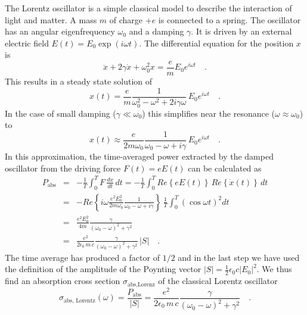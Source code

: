 The Lorentz oscillator is a simple classical model to describe the interaction of light and matter. A mass $m$ of charge $+e$ is connected to a spring. The oscillator has an angular eigenfrequency $\omega_0$ and a damping $\gamma$. It is driven by an external electric field $E(t) = E_0 \exp(i \omega t)$. The differential equation for the position $x$ is
\begin{equation}
  \ddot{x} + 2 \gamma \dot{x} + \omega_0^2 x = \frac{e}{m} E_0 e^{i \omega t} \quad . \label{eq:1_dgl_osci}
\end{equation}
This results in a steady state solution of
\begin{equation}
  x(t) = \frac{e}{m}  \frac{1}{\omega_0^2 - \omega^2 + 2 i \gamma \omega} \, E_0 e^{i \omega t}  \quad .
\end{equation}
In the case of small damping ($\gamma \ll \omega_0$) this simplifies near the resonance ($\omega \approx \omega_0$) to
\begin{equation}
  x(t) \approx \frac{e}{2 m \omega_0}  \frac{1}{\omega_0 - \omega + i \gamma} \, E_0 e^{i \omega t}  \quad .
\end{equation}
In this approximation, the time-averaged power extracted by the damped oscillator from the driving force $F(t) = e E(t)$ can be calculated as
%
\begin{eqnarray}
 P_{\text{abs}} &= &  - \frac{1}{T} \int_0^T F \, \frac{d x}{dt} \, dt =  
  - \frac{1}{T}  \int_0^T Re \left\{  e E(t) \right\}  \, Re \left\{ \dot{x}(t) \right\} \, dt \\
  & = & - Re \left\{i \omega  \frac{e^2  E_0^2 }{2 m \omega_0}  \frac{1}{\omega_0 - \omega +  i \gamma } \right\}  \,   \frac{1}{T}  \int_0^T \left( \cos \omega t \right)^2 dt \\
%
& = & \frac{e^2 E_0^2  }{4 m }  \frac{\gamma }{(\omega_0 - \omega)^2 +  \gamma ^2}  \\
&  = &  \frac{e^2  }{2 \epsilon_0 \, m \,c }  \frac{\gamma }{(\omega_0 - \omega)^2 +  \gamma ^2}  \, |S|  \quad .
\end{eqnarray}
%
The time average has produced a factor of $1/2$ and in the last step we have used the definition of the amplitude of the Poynting vector $|S| = \frac{1}{2} \epsilon_0 c |E_0|^2$. 
We thus find an absorption cross section $\sigma_{\text{abs,Lorenz}}$ of the classical Lorentz oscillator
\begin{equation}
 \sigma_{\text{abs, Lorentz}}(\omega) = \frac{ P_{\text{abs}} }{|S| } = \frac{e^2  }{2 \epsilon_0 \,  m \, c}  \frac{\gamma }{(\omega_0 - \omega)^2 +  \gamma ^2}  \quad .
\end{equation}

